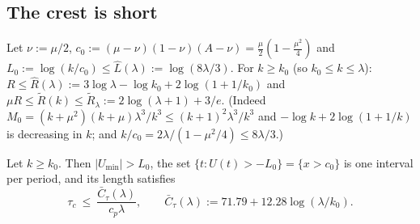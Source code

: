 \subsection{The crest is short}\label{lg:sec:crest}
Let $\nu:=\mu/2$, $c_0:=(\mu-\nu)(1-\nu)(A-\nu)=\tfrac\mu2(1-\tfrac{\mu^2}4)$ and
$L_0:=\log(k/c_0)\le\hat L(\lambda):=\log(8\lambda/3)$. For $k\ge k_0$ (so $k_0\le k\le\lambda$):
$R\le\hat R(\lambda):=3\log\lambda-\log k_0+2\log(1+1/k_0)$ and
$\mu R\le\tilde R(k)\le\tilde R_\lambda:=2\log(\lambda+1)+3/e$. (Indeed
$M_0=(k+\mu^2)(k+\mu)\lambda^3/k^3\le(k+1)^2\lambda^3/k^3$ and $-\log k+2\log(1+1/k)$ is decreasing in
$k$; and $k/c_0=2\lambda/(1-\mu^2/4)\le8\lambda/3$.)

\begin{lemma}\label{lg:lem:crest}
Let $k\ge k_0$. Then $|U_{\min}|>L_0$, the set $\{t:U(t)>-L_0\}=\{x>c_0\}$ is one interval per period, and
its length satisfies
\[
\tau_c\ \le\ \frac{\bar C_\tau(\lambda)}{c_p\lambda},\qquad \bar C_\tau(\lambda):=71.79+12.28\log(\lambda/k_0).
\]
\end{lemma}
